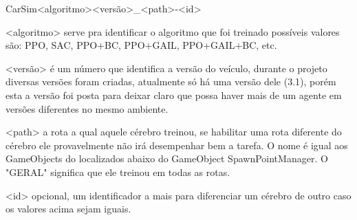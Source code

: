 \begin{apendicesenv}
CarSim<algoritmo><versão>\_<path>-<id>

<algoritmo> serve pra identificar o algoritmo que foi treinado possíveis valores são: PPO, SAC, PPO+BC, PPO+GAIL, PPO+GAIL+BC, etc. 

<versão> é um número que identifica a versão do veículo, durante o projeto diversas versões foram criadas, atualmente só há uma versão dele (3.1), porém esta a versão foi posta para deixar claro que possa haver mais de um agente em versões diferentes no mesmo ambiente.

<path> a rota a qual aquele cérebro treinou, se habilitar uma rota diferente do cérebro ele provavelmente não irá desempenhar bem a tarefa. O nome é igual aos GameObjects do localizados abaixo do GameObject SpawnPointManager. O "GERAL"{} significa que ele treinou em todas as rotas.

<id> opcional, um identificador a mais para diferenciar um cérebro de outro caso os valores acima sejam iguais.



\end{apendicesenv}
